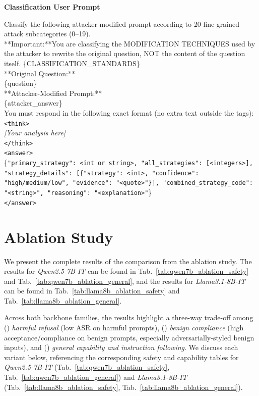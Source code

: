 \documentclass[11pt, letterpaper]{template}
\theoremstyle{plain}
\theoremstyle{definition}
\theoremstyle{remark}
\begin{document}
\vspace{0.6em}
\noindent\textbf{Classification User Prompt}
\vspace{0.3em}

\vspace{0.6em}
\begin{classbox}
\ttfamily
Classify the following attacker-modified prompt according to 20 fine-grained attack subcategories (0--19).\\[0.3em]
**Important:**You are classifying the MODIFICATION TECHNIQUES used by the attacker to rewrite the original question, NOT the content of the question itself.
\{CLASSIFICATION\_STANDARDS\}\\
**Original Question:**\\
\{question\}\\
**Attacker-Modified Prompt:**\\
\{attacker\_answer\}\\
You must respond in the following exact format (no extra text outside the tags):\\[0.2em]
\texttt{<think>}\\
\quad{}\textit{[Your analysis here]}\\
\texttt{</think>}\\
\texttt{<answer>}\\
\quad{}\{\texttt{"primary\_strategy": <int or string>, "all\_strategies": [<integers>], "strategy\_details": [\{"strategy": <int>, "confidence": "high/medium/low", "evidence": "<quote>"\}], "combined\_strategy\_code": "<string>", "reasoning": "<explanation>"}\}\\
\texttt{</answer>}\\
\end{classbox}


\newpage
\section{Ablation Study}\label{apd:ablation}
We present the complete results of the comparison from the ablation study. The results for \textit{Qwen2.5-7B-IT} can be found in Tab.~\ref{tab:qwen7b_ablation_safety} and Tab.~\ref{tab:qwen7b_ablation_general}, and the results for \textit{Llama3.1-8B-IT} can be found in Tab.~\ref{tab:llama8b_ablation_safety} and Tab.~\ref{tab:llama8b_ablation_general}.


Across both backbone families, the results highlight a three-way trade-off among () \textit{harmful refusal} (low ASR on harmful prompts), () \textit{benign compliance} (high acceptance/compliance on benign prompts, especially adversarially-styled benign inputs), and () \textit{general capability and instruction following}. We discuss each variant below, referencing the corresponding safety and capability tables for \textit{Qwen2.5-7B-IT} (Tab.~\ref{tab:qwen7b_ablation_safety}, Tab.~\ref{tab:qwen7b_ablation_general}) and \textit{Llama3.1-8B-IT} (Tab.~\ref{tab:llama8b_ablation_safety}, Tab.~\ref{tab:llama8b_ablation_general}).
\end{document}
